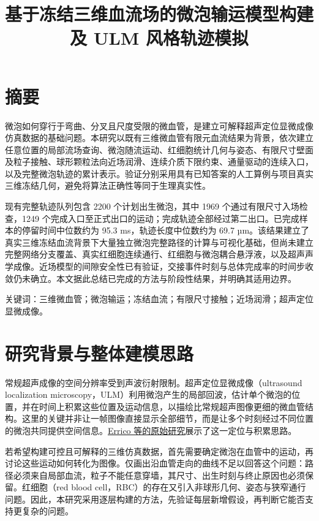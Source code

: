 \documentclass[UTF8,a4paper,11pt,fontset=fandol]{ctexart}
\title{基于冻结三维血流场的微泡输运模型构建及 ULM 风格轨迹模拟}
\author{}
\date{}
\begin{document}
\maketitle


\section*{摘要}

微泡如何穿行于弯曲、分叉且尺度受限的微血管，是建立可解释超声定位显微成像仿真数据的基础问题。本研究以既有三维微血管有限元血流结果为背景，依次建立任意位置的局部流场查询、微泡随流运动、红细胞统计几何与姿态、有限尺寸壁面及粒子接触、球形颗粒法向近场润滑、连续介质下限约束、通量驱动的连续入口，以及完整微泡轨迹的累计表示。验证分别采用具有已知答案的人工算例与项目真实三维冻结几何，避免将算法正确性等同于生理真实性。

现有完整轨迹队列包含 2200 个计划出生微泡，其中 1969 个通过有限尺寸入场检查，1249 个完成入口至正式出口的运动；完成轨迹全部经过第二出口。已完成样本的停留时间中位数约为 95.3 ms，轨迹长度中位数约为 69.7 µm。该结果建立了真实三维冻结血流背景下大量独立微泡完整路径的计算与可视化基础，但尚未建立完整网络分支覆盖、真实红细胞连续通行、红细胞与微泡耦合悬浮液，以及超声声学成像。近场模型的间隙安全性已有验证，交接事件时刻与总体完成率的时间步收敛仍未确立。本文据此总结已完成的方法与阶段性结果，并明确其适用边界。

关键词：三维微血管；微泡输运；冻结血流；有限尺寸接触；近场润滑；超声定位显微成像。

\section{研究背景与整体建模思路}

常规超声成像的空间分辨率受到声波衍射限制。超声定位显微成像（ultrasound localization microscopy，ULM）利用微泡产生的局部回波，估计单个微泡的位置，并在时间上积累这些位置及运动信息，以描绘比常规超声图像更细的微血管结构。这里的关键并非让一帧图像直接显示全部细节，而是让多个时刻经过不同位置的微泡共同提供空间信息。\href{https://www.nature.com/articles/nature16066}{Errico 等的原始研究}展示了这一定位与积累思路。

若希望构建可控且可解释的三维仿真数据，首先需要确定微泡在血管中的运动，再讨论这些运动如何转化为图像。仅画出沿血管走向的曲线不足以回答这个问题：路径必须来自局部血流，粒子不能任意穿墙，其尺寸、出生时刻与终止原因也必须保留。红细胞（red blood cell，RBC）的存在又引入非球形几何、姿态与狭窄通行问题。因此，本研究采用逐层构建的方法，先验证每层新增假设，再判断它能否支持更复杂的问题。
\end{document}
